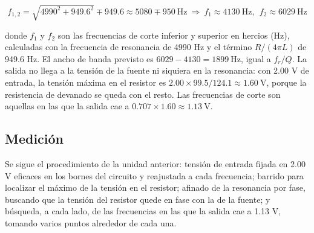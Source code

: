 \documentclass[11pt,letterpaper]{article}
\begin{document}
\begin{equation}
  f_{1,2} = \sqrt{4990^{2} + 949.6^{2}} \mp 949.6 \approx 5080 \mp 950\ \text{Hz} \ \Rightarrow\ f_1 \approx 4130\ \text{Hz},\ \ f_2 \approx 6029\ \text{Hz}
\end{equation}

donde $f_1$ y $f_2$ son las frecuencias de corte inferior y superior en hercios (Hz), calculadas con la frecuencia de resonancia de 4990 Hz y el término $R/(4\pi L)$ de 949.6 Hz. El ancho de banda previsto es $6029 - 4130 = 1899\ \text{Hz}$, igual a $f_r/Q$. La salida no llega a la tensión de la fuente ni siquiera en la resonancia: con 2.00 V de entrada, la tensión máxima en el resistor es $2.00 \times 99.5/124.1 \approx 1.60\ \text{V}$, porque la resistencia de devanado se queda con el resto. Las frecuencias de corte son aquellas en las que la salida cae a $0.707 \times 1.60 \approx 1.13\ \text{V}$.

\subsection{Medición}

Se sigue el procedimiento de la unidad anterior: tensión de entrada fijada en 2.00 V eficaces en los bornes del circuito y reajustada a cada frecuencia; barrido para localizar el máximo de la tensión en el resistor; afinado de la resonancia por fase, buscando que la tensión del resistor quede en fase con la de la fuente; y búsqueda, a cada lado, de las frecuencias en las que la salida cae a 1.13 V, tomando varios puntos alrededor de cada una.
\end{document}
